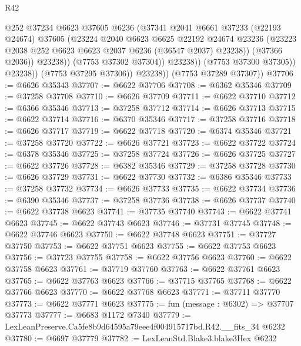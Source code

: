 \begin{lexlean}{R42}
\begin{coremodule}
{                            @252
                            @37234
                            @6623
                            @37605
                            @6236
                            (@37341
                              @2041
                              @6661
                              @37233
                              (@22193 @24674)
                              @37605
                              (@23224
                                @2040
                                @6623
                                @6625
                                @22192
                                @24674
                                @23236
                                (@23223 @2038 @252 @6623 @6623 @2037 @6236 (@36547 @2037) @23238))
                              (@37366 @2036))
                            @23238))
                        (@7753 @37302 @37304))
                      @23238))
                  (@7753 @37300 @37305))
                @23238))
            (@7753 @37295 @37306))
          @23238))
      (@7753 @37289 @37307))
@37706 := @6626 @35343
@37707 := @6622 @37706
@37708 := @6362 @35346
@37709 := @37258 @37708
@37710 := @6626 @37709
@37711 := @6622 @37710
@37712 := @6366 @35346
@37713 := @37258 @37712
@37714 := @6626 @37713
@37715 := @6622 @37714
@37716 := @6370 @35346
@37717 := @37258 @37716
@37718 := @6626 @37717
@37719 := @6622 @37718
@37720 := @6374 @35346
@37721 := @37258 @37720
@37722 := @6626 @37721
@37723 := @6622 @37722
@37724 := @6378 @35346
@37725 := @37258 @37724
@37726 := @6626 @37725
@37727 := @6622 @37726
@37728 := @6382 @35346
@37729 := @37258 @37728
@37730 := @6626 @37729
@37731 := @6622 @37730
@37732 := @6386 @35346
@37733 := @37258 @37732
@37734 := @6626 @37733
@37735 := @6622 @37734
@37736 := @6390 @35346
@37737 := @37258 @37736
@37738 := @6626 @37737
@37740 := @6622 @37738 @6623
@37741 := @37735 @37740
@37743 := @6622 @37741 @6623
@37745 := @6622 @37743 @6623
@37746 := @37731 @37745
@37748 := @6622 @37746 @6623
@37750 := @6622 @37748 @6623
@37751 := @37727 @37750
@37753 := @6622 @37751 @6623
@37755 := @6622 @37753 @6623
@37756 := @37723 @37755
@37758 := @6622 @37756 @6623
@37760 := @6622 @37758 @6623
@37761 := @37719 @37760
@37763 := @6622 @37761 @6623
@37765 := @6622 @37763 @6623
@37766 := @37715 @37765
@37768 := @6622 @37766 @6623
@37770 := @6622 @37768 @6623
@37771 := @37711 @37770
@37773 := @6622 @37771 @6623
@37775 := fun (message : @6302) => @37707 @37773
@37777 := @6683 @1172 @7340
@37779 := LexLeanPreserve.Ca5fe8b9d64595a79eee4f004915717bd.R42.__fits_34 @6232
@37780 := @6697 @37779
@37782 := LexLeanStd.Blake3.blake3Hex @6232
}
\end{coremodule}
\end{lexlean}
